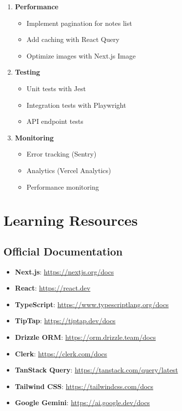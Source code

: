 \documentclass[11pt,a4paper]{article}
\begin{document}
\begin{enumerate}
    \item \textbf{Performance}
    \begin{itemize}
        \item Implement pagination for notes list
        \item Add caching with React Query
        \item Optimize images with Next.js Image
    \end{itemize}
    
    \item \textbf{Testing}
    \begin{itemize}
        \item Unit tests with Jest
        \item Integration tests with Playwright
        \item API endpoint tests
    \end{itemize}
    
    \item \textbf{Monitoring}
    \begin{itemize}
        \item Error tracking (Sentry)
        \item Analytics (Vercel Analytics)
        \item Performance monitoring
    \end{itemize}
\end{enumerate}


\section{Learning Resources}

\subsection{Official Documentation}

\begin{itemize}
    \item \textbf{Next.js}: \url{https://nextjs.org/docs}
    \item \textbf{React}: \url{https://react.dev}
    \item \textbf{TypeScript}: \url{https://www.typescriptlang.org/docs}
    \item \textbf{TipTap}: \url{https://tiptap.dev/docs}
    \item \textbf{Drizzle ORM}: \url{https://orm.drizzle.team/docs}
    \item \textbf{Clerk}: \url{https://clerk.com/docs}
    \item \textbf{TanStack Query}: \url{https://tanstack.com/query/latest}
    \item \textbf{Tailwind CSS}: \url{https://tailwindcss.com/docs}
    \item \textbf{Google Gemini}: \url{https://ai.google.dev/docs}
\end{itemize}
\end{document}
